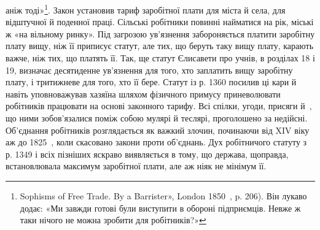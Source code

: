 \parcont{}  %
аніж тоді»\footnote{
Sophisms of Free Trade. By a Barrister», London 1850~, p. 206).
Він лукаво додає: «Ми завжди готові були виступити в обороні підприємців.
Невже ж таки нічого не можна зробити для робітників?»
}. Закон установив тариф заробітної плати для міста
й села, для відштучної й поденної праці. Сільські робітники
повинні найматися на рік, міські ж «на вільному ринку». Під
загрозою ув’язнення забороняється платити заробітну плату
вищу, ніж її приписує статут, але тих, що беруть таку вищу
плату, карають важче, ніж тих, що платять її. Так, ще статут
Єлисавети про учнів, в розділах 18 і 19, визначає десятиденне
ув’язнення для того, хто заплатить вищу заробітну плату, і
тритижневе для того, хто її бере. Статут із р. 1360 посилив ці
кари й навіть уповноважував хазяїна шляхом фізичного примусу
приневолювати робітників працювати на основі законного тарифу.
Всі спілки, угоди, присяги й~, що ними зобов’язалися поміж
собою мулярі й теслярі, проголошено за недійсні. Об’єднання
робітників розглядається як важкий злочин, починаючи від
XIV віку аж до 1825~, коли скасовано закони проти об’єднань.
Дух робітничого статуту з р. 1349 і всіх пізніших яскраво виявляється
в тому, що держава, щоправда, встановлювала максимум
заробітної плати, але аж ніяк не мінімум її.

